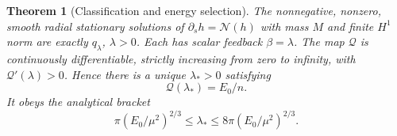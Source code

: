 \documentclass[11pt]{article}
\numberwithin{equation}{section}
\newtheorem{theorem}{Theorem}[section]
\begin{document}
\begin{theorem}[Classification and energy selection]\label{r13:gibbs}
The nonnegative, nonzero, smooth radial stationary solutions of
$\partial_sh=\mathcal N(h)$ with mass $M$ and finite $H^1$ norm are
exactly $q_\lambda$, $\lambda>0$. Each has scalar feedback $\beta=\lambda$.
The map $\mathcal Q$ is continuously differentiable, strictly increasing
from zero to infinity, with $\mathcal Q'(\lambda)>0$. Hence there is a
unique $\lambda_*>0$ satisfying
\begin{equation}\label{r13:energyselection}
 \mathcal Q(\lambda_*)=E_0/n.
\end{equation}
It obeys the analytical bracket
\begin{equation}\label{r13:lambdabracket}
 \pi(E_0/\mu^2)^{2/3}\le\lambda_*
                    \le8\pi(E_0/\mu^2)^{2/3}.
\end{equation}
\end{theorem}
\end{document}
